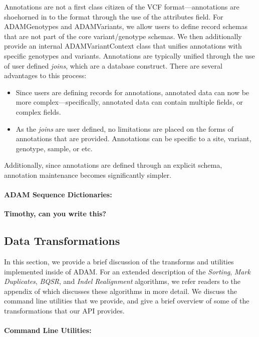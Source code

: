 \documentclass{bioinfo}
\begin{document}
Annotations are not a first class citizen of the VCF format---annotations are shoehorned in to the format through the use of the attributes field. For ADAMGenotypes and
ADAMVariants, we allow users to define record schemas that are not part of the core variant/genotype schemas. We then additionally provide an internal ADAMVariantContext
class that unifies annotations with specific genotypes and variants. Annotations are typically unified through the use of user defined \emph{joins}, which are a database
construct. There are several advantages to this process:

\begin{itemize}
\item Since users are defining records for annotations, annotated data can now be more complex---specifically, annotated data can contain multiple fields, or complex fields.
\item As the \emph{joins} are user defined, no limitations are placed on the forms of annotations that are provided. Annotations can be specific to a site, variant, genotype,
sample, or etc.
\end{itemize}

Additionally, since annotations are defined through an explicit schema, annotation maintenance becomes significantly simpler.

\paragraph{ADAM Sequence Dictionaries:}
\label{sec:adam-sequence-dictionaries}

\textbf{Timothy, can you write this?}

\subsection{Data Transformations}
\label{sec:data-transformations}

In this section, we provide a brief discussion of the transforms and utilities implemented inside of ADAM. For an extended description of the \textit{Sorting}, \textit{Mark
Duplicates}, \textit{BQSR}, and \textit{Indel Realignment} algorithms, we refer readers to the appendix of \citet{massie13} which discusses these algorithms in more detail.
We discuss the command line utilities that we provide, and give a brief overview of some of the transformations that our API provides.

\paragraph{Command Line Utilities:}
\label{sec:command-line-utilities}
\end{document}
